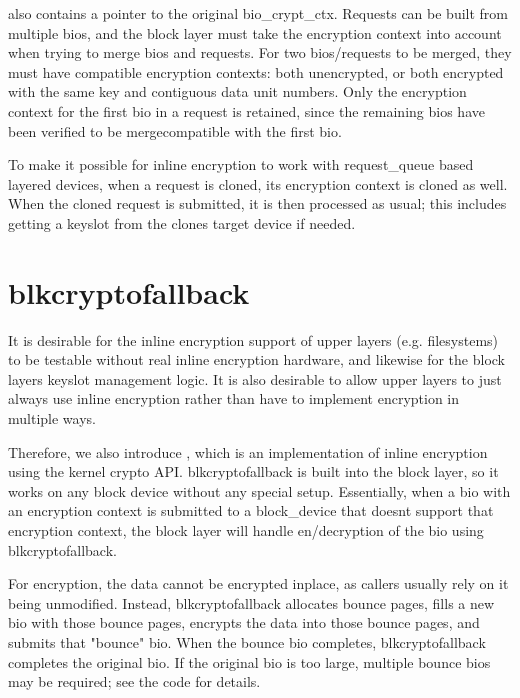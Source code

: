 \documentclass[a4paper,11pt,english]{sphinxmanual}
\begin{document}
 also contains a pointer to the original bio\_crypt\_ctx.
Requests can be built from multiple bios, and the block layer must take the
encryption context into account when trying to merge bios and requests.  For two
bios/requests to be merged, they must have compatible encryption contexts: both
unencrypted, or both encrypted with the same key and contiguous data unit
numbers.  Only the encryption context for the first bio in a request is
retained, since the remaining bios have been verified to be merge\sphinxhyphen{}compatible
with the first bio.

To make it possible for inline encryption to work with request\_queue based
layered devices, when a request is cloned, its encryption context is cloned as
well.  When the cloned request is submitted, it is then processed as usual; this
includes getting a keyslot from the clone\textquotesingle{}s target device if needed.


\section{blk\sphinxhyphen{}crypto\sphinxhyphen{}fallback}
\label{\detokenize{inline-encryption:blk-crypto-fallback}}
It is desirable for the inline encryption support of upper layers (e.g.
filesystems) to be testable without real inline encryption hardware, and
likewise for the block layer\textquotesingle{}s keyslot management logic.  It is also desirable
to allow upper layers to just always use inline encryption rather than have to
implement encryption in multiple ways.

Therefore, we also introduce , which is an implementation
of inline encryption using the kernel crypto API.  blk\sphinxhyphen{}crypto\sphinxhyphen{}fallback is built
into the block layer, so it works on any block device without any special setup.
Essentially, when a bio with an encryption context is submitted to a
block\_device that doesn\textquotesingle{}t support that encryption context, the block layer will
handle en/decryption of the bio using blk\sphinxhyphen{}crypto\sphinxhyphen{}fallback.

For encryption, the data cannot be encrypted in\sphinxhyphen{}place, as callers usually rely
on it being unmodified.  Instead, blk\sphinxhyphen{}crypto\sphinxhyphen{}fallback allocates bounce pages,
fills a new bio with those bounce pages, encrypts the data into those bounce
pages, and submits that "bounce" bio.  When the bounce bio completes,
blk\sphinxhyphen{}crypto\sphinxhyphen{}fallback completes the original bio.  If the original bio is too
large, multiple bounce bios may be required; see the code for details.
\end{document}
